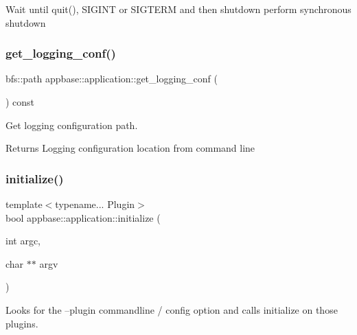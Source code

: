 Wait until quit(), S\+I\+G\+I\+NT or S\+I\+G\+T\+E\+RM and then shutdown perform synchronous shutdown \mbox{\label{classappbase_1_1application_a9abb5f5858e4dc6ba3ba45071ffdaed5}} 
\subsubsection{\texorpdfstring{get\+\_\+logging\+\_\+conf()}{get\_logging\_conf()}}
{\footnotesize\ttfamily bfs\+::path appbase\+::application\+::get\+\_\+logging\+\_\+conf (\begin{DoxyParamCaption}{ }\end{DoxyParamCaption}) const}



Get logging configuration path. 

\begin{DoxyReturn}{Returns}
Logging configuration location from command line 
\end{DoxyReturn}
\mbox{\label{classappbase_1_1application_a29ed51314f78ebe6795930a4ca910fd6}} 
\subsubsection{\texorpdfstring{initialize()}{initialize()}}
{\footnotesize\ttfamily template$<$typename... Plugin$>$ \\
bool appbase\+::application\+::initialize (\begin{DoxyParamCaption}\item[{int}]{argc,  }\item[{char $\ast$$\ast$}]{argv }\end{DoxyParamCaption})\hspace{0.3cm}{\ttfamily [inline]}}



Looks for the --plugin commandline / config option and calls initialize on those plugins. 


